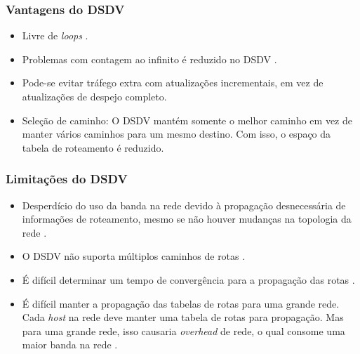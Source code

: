 \subsubsection{Vantagens do DSDV}
\begin{itemize}
	\item Livre de \textit{loops} \cite{gorantala}.
	\item Problemas com contagem ao infinito \'e reduzido no DSDV \cite{gorantala}.
	\item Pode-se evitar tr\'afego extra com atualiza\c{c}\~oes incrementais, em vez de atualiza\c{c}\~oes de despejo completo.
	\item Sele\c{c}\~ao de caminho: O DSDV mant\'em somente o melhor caminho em vez de manter v\'arios caminhos para um mesmo destino. Com isso, o espa\c{c}o da tabela de roteamento \'e reduzido.
\end{itemize}

\subsubsection{Limita\c{c}\~ oes do DSDV}
\begin{itemize}
	\item Desperd\'icio do uso da banda na rede devido \`a propaga\c{c}\~ao desnecess\'aria de informa\c{c}\~oes de roteamento, mesmo se n\~ao houver mudan\c{c}as na topologia da rede \cite{Patel00energyin}.	
	\item O DSDV n\~ao suporta m\'ultiplos caminhos de rotas \cite{gorantala}.
	\item \'E dif\'icil determinar um tempo de converg\^encia para a propaga\c{c}\~ao das rotas \cite{heg}.
	\item \'E dif\'icil manter a propaga\c{c}\~ao das tabelas de rotas para uma grande rede. Cada \textit{host} na rede deve manter uma tabela de rotas para propaga\c{c}\~ao. Mas para uma grande rede, isso causaria \textit{overhead} de rede, o qual consome uma maior banda na rede \cite{gorantala}.
\end{itemize}
